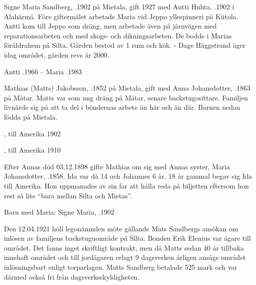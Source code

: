 Signe Maria Sandberg, .1902 på Mietala, gift 1927 med Antti Huhta, .1902 i Alahärmä. Före giftermålet arbetade Maria vid Jeppo yllespinneri på Kiitola. Antti kom till Jeppo som dräng, men arbetade även på järnvägen med reparationsarbeten och med skogs- och dikningsarbeten. De bodde i Marias föräldrahem på Silta. Gården bestod av 1 rum och kök. - Dage Häggstrand äger idag området, gården revs år 2000.
\begin{jhchildren}
  \item {}
  \item {}
  \item {}
\end{jhchildren}

Antti .1966  --  Maria .1983


Mathias (Matts) Jakobsson, .1852 på Mietala, gift med Anna Johansdotter, .1863 på Måtar. Matts var som ung dräng på Måtar, senare backstugosittare. Familjen livnärde sig på att ta del i böndernas arbete än här och än där. Barnen nedan födda på Mietala.
\begin{jhchildren}
  \item {}, till Amerika 1902
  \item {}
  \item {}
  \item {}
  \item {}, till Amerika 1910
  \item {}
\end{jhchildren}
Efter Annas död 03.12.1898 gifte Mathias om sig med Annas syster, Maria Johansdotter,  .1858. Ida var då 14 och Johannes 6 år. 18 år gammal begav sig Ida till Amerika. Hon uppmanades av sin far att hålla reda på biljetten eftersom hon rest så lite ``bara mellan Silta och Mietas''.

Barn med Maria: Signe Maria, .1902

Den 12.04.1921 höll legonämnden möte gällande Mats Sandbergs ansökan om inlösen av familjens backstuguområde på Silta. Bonden Erik Elenius var ägare till området. Det fanns inget skriftligt kontrakt, men då Matts sedan 40 år tillbaka innehaft området och till jordägaren erlagt 9 dagsverken årligen ansågs området inlösningsbart enligt torparlagen. Matts Sandberg betalade 525 mark och var därmed också fri från dagsverksskyldigheten.

